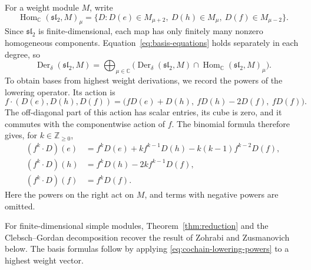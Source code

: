 \documentclass[11pt,reqno]{amsart}
\numberwithin{equation}{section}
\newcommand{\C}{\mathbb C}
\newcommand{\Z}{\mathbb Z}
\newcommand{\s}{\mathfrak{sl}_2}
\DeclareMathOperator{\Der}{Der}
\DeclareMathOperator{\Hom}{Hom}
\theoremstyle{definition}
\theoremstyle{remark}
\begin{document}
For a weight module \(M\), write
\[
\Hom_\C(\s,M)_\mu
=\{D:D(e)\in M_{\mu+2},\ D(h)\in M_\mu,\ D(f)\in M_{\mu-2}\}.
\]
Since \(\s\) is finite-dimensional, each map has only finitely many
nonzero homogeneous components. Equation~\eqref{eq:basis-equations}
holds separately in each degree, so
\[
\Der_\delta(\s,M)=\bigoplus_{\mu\in\C}
\bigl(\Der_\delta(\s,M)\cap\Hom_\C(\s,M)_\mu\bigr).
\]
To obtain bases from highest weight derivations, we record the powers
of the lowering operator. Its action is
\begin{equation}\label{eq:cochain-lowering}
f\cdot(D(e),D(h),D(f))=
\bigl(fD(e)+D(h),\ fD(h)-2D(f),\ fD(f)\bigr).
\end{equation}
The off-diagonal part of this action has scalar entries, its cube
is zero, and it commutes with the componentwise action of \(f\).
The binomial formula therefore gives, for \(k\in\Z_{\ge0}\),
\begin{equation}\label{eq:cochain-lowering-powers}
\begin{aligned}
(f^k\cdot D)(e)&=f^kD(e)+kf^{k-1}D(h)-k(k-1)f^{k-2}D(f),\\
(f^k\cdot D)(h)&=f^kD(h)-2kf^{k-1}D(f),\\
(f^k\cdot D)(f)&=f^kD(f).
\end{aligned}
\end{equation}
Here the powers on the right act on \(M\), and terms with
negative powers are omitted.

For finite-dimensional simple modules, Theorem~\ref{thm:reduction}
and the Clebsch--Gordan decomposition recover the result of
Zohrabi and Zusmanovich below. The basis formulas follow by applying
\eqref{eq:cochain-lowering-powers} to a highest weight vector.
\end{document}
